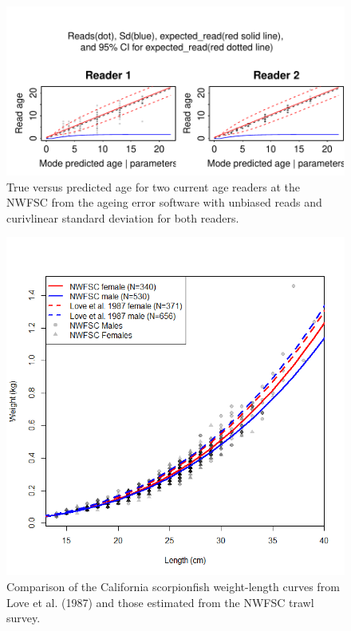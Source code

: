 \documentclass[12pt,]{article}
\begin{document}
\begin{figure}[htbp]
\centering
\includegraphics{Figures/Fleet8_NWFSCTrawl_ageerror2.pdf}
\caption{True versus predicted age for two current age readers at the
NWFSC from the ageing error software with unbiased reads and curivlinear
standard deviation for both readers.
\label{fig:Fleet8_NWFSCTrawl_ageerror2}}
\end{figure}

\begin{figure}[htbp]
\centering
\includegraphics{Figures/Length_weight.png}
\caption{Comparison of the California scorpionfish weight-length curves
from Love et al. (1987) and those estimated from the NWFSC trawl survey.
\label{fig:Length_weight}}
\end{figure}
\end{document}
